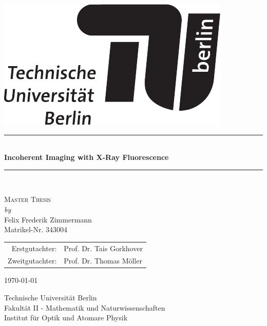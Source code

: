 \begin{titlepage}
		
	\begin{center}
				
				
		\begin{flushright}
			\includegraphics[width=.3\textwidth]{images/TU_Logo.pdf}\\[2.5cm]    
			\end{flushright}
					
					
			{\newcommand{\HRule}{\rule{\linewidth}{0.5mm}}
				\HRule \\[0.4cm]
				\LARGE{\bfseries Incoherent Imaging with X-Ray Fluorescence}\\
							
				\HRule \\[1.5cm]}
			\textsc{\Large Master Thesis}\\[0.5cm]
					
			\emph{by}\\
			Felix Frederik Zimmermann\\
			Matrikel-Nr. 343004\\[0.5cm]
			
			\begin{table}[h]
				\centering
				\begin{tabular}{rl}
					Erstgutachter:& Prof. Dr. Tais Gorkhover\\
					Zweitgutachter:& Prof. Dr. Thomas Möller\\
				\end{tabular}
			\end{table}		
			{\large \today}
			
			\vfill
					
			Technische Universität Berlin\\
			Fakultät II - Mathematik und Naturwissenschaften\\
			Institut für Optik und Atomare Physik\\					
		\end{center}
			
	\end{titlepage}